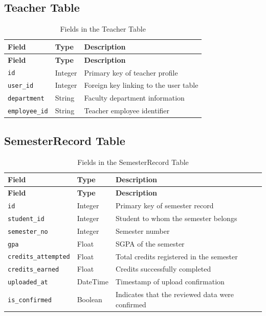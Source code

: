 \subsection{Teacher Table}
\begin{longtable}{p{}p{}p{}}
\caption{Fields in the Teacher Table}\\
\toprule
\textbf{Field} & \textbf{Type} & \textbf{Description} \\
\midrule
\endfirsthead
\toprule
\textbf{Field} & \textbf{Type} & \textbf{Description} \\
\midrule
\endhead
\texttt{id} & Integer & Primary key of teacher profile \\
\texttt{user\_id} & Integer & Foreign key linking to the user table \\
\texttt{department} & String & Faculty department information \\
\texttt{employee\_id} & String & Teacher employee identifier \\
\bottomrule
\end{longtable}

\subsection{SemesterRecord Table}
\begin{longtable}{p{}p{}p{}}
\caption{Fields in the SemesterRecord Table}\\
\toprule
\textbf{Field} & \textbf{Type} & \textbf{Description} \\
\midrule
\endfirsthead
\toprule
\textbf{Field} & \textbf{Type} & \textbf{Description} \\
\midrule
\endhead
\texttt{id} & Integer & Primary key of semester record \\
\texttt{student\_id} & Integer & Student to whom the semester belongs \\
\texttt{semester\_no} & Integer & Semester number \\
\texttt{gpa} & Float & SGPA of the semester \\
\texttt{credits\_attempted} & Float & Total credits registered in the semester \\
\texttt{credits\_earned} & Float & Credits successfully completed \\
\texttt{uploaded\_at} & DateTime & Timestamp of upload confirmation \\
\texttt{is\_confirmed} & Boolean & Indicates that the reviewed data were confirmed \\
\bottomrule
\end{longtable}

